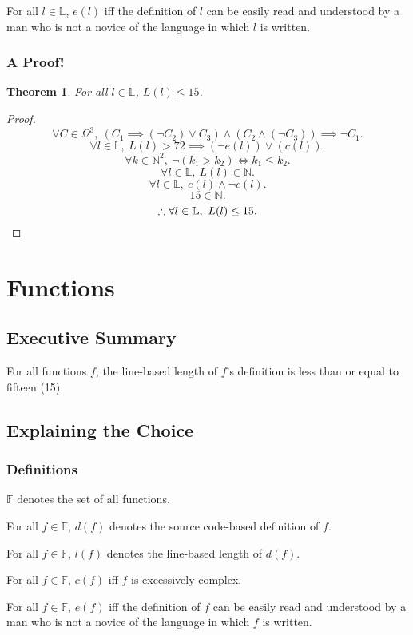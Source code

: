 \documentclass{report}
\newtheorem{thm}{Theorem}
\begin{document}
For all $l \in \mathbb L$, $e(l)$ iff the definition of $l$ can be easily read and understood by a man who is not a novice of the language in which $l$ is written.
\subsubsection{A Proof!}
\begin{thm}
	For all $l \in \mathbb L$, $L(l) \leq 15$.
\end{thm}
\begin{proof}
	\[
		\forall C \in \Omega^3,\ 
		\left(C_1 \implies (\neg C_2) \lor C_3\right)
		\land
		\left(C_2 \land (\neg C_3)\right)
		\implies \neg C_1.
	\]
	\[
		\forall l \in \mathbb L,\ 
		L(l) > 72 \implies \left(\neg e(l)\right) \lor \left(c(l)\right).
	\]
	\[
		\forall k \in \mathbb N^2,\ 
		\neg \left(k_1 > k_2\right) \iff k_1 \leq k_2.
	\]
	\[
		\forall l \in \mathbb L,\ 
		L(l) \in \mathbb N.
	\]
	\[
		\forall l \in \mathbb L,\ 
		e(l) \land \neg c(l).
	\]
	\[
		15 \in \mathbb N.
	\]
	\[
		\therefore
		\forall l \in \mathbb L,\ 
		L(l) \leq 15.
		\qedhere
	\]
\end{proof}
\section{Functions}
\subsection{Executive Summary}
For all functions $f$, the line-based length of $f$'s definition is less than or equal to fifteen (15).
\subsection{Explaining the Choice}
\subsubsection{Definitions}
$\mathbb F$ denotes the set of all functions.

For all $f \in \mathbb F$, $d(f)$ denotes the source code-based definition of $f$.

For all $f \in \mathbb F$, $l(f)$ denotes the line-based length of $d(f)$.

For all $f \in \mathbb F$, $c(f)$ iff $f$ is excessively complex.

For all $f \in \mathbb F$, $e(f)$ iff the definition of $f$ can be easily read and understood by a man who is not a novice of the language in which $f$ is written.
\end{document}
